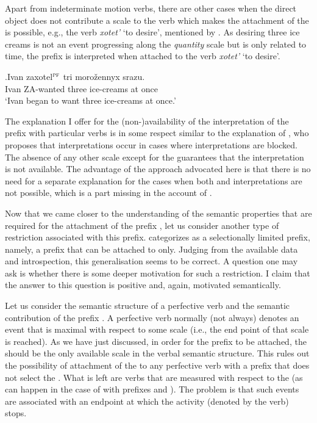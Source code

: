 Apart from indeterminate motion verbs, there are other cases when the direct object does not contribute a scale to the verb which makes the attachment of the   is possible, e.g., the verb \textit{xotet'} `to desire', mentioned by \citet{Braginsky:08}. As desiring three ice creams is not an event progressing along the \textit{quantity} scale but is only related to time, the prefix  is interpreted  when attached to the verb \textit{xotet'} `to desire'.

\exg.\label{ex:zaxotet}Ivan zaxotel$^{\textsc{pf}}$ tri moro\v{z}ennyx srazu.\\
Ivan ZA-wanted three ice-creams {at once}\\
\trans `Ivan began to want three ice-creams at once.'
\\

The explanation I offer for the (non-)availability of the  interpretation of the prefix  with particular verbs is in some respect similar to the explanation of \citet{Braginsky:08}, who proposes that  interpretations occur in cases where  interpretations are blocked. The absence of any other scale except for the  guarantees that the  interpretation is not available. The advantage of the approach advocated here is that there is no need for a separate explanation for the cases when both  and  interpretations are not possible, which is a part missing in the account of \citet{Braginsky:08}.

Now that we came closer to the understanding of the semantic properties that are required for the attachment of the  prefix , let us consider another type of restriction associated with this prefix. \citet{Tatevosov:09} categorizes  as a selectionally limited prefix, namely, a prefix that can be attached to  only. Judging from the available data and introspection, this generalisation seems to be correct. A question one may ask is whether there is some deeper motivation for such a restriction. I claim that the answer to this question is positive and, again, motivated semantically. 

Let us consider the semantic structure of a perfective verb and the semantic contribution of the  prefix . A perfective verb normally (not always) denotes an event that is maximal with respect to some scale (i.e., the end point of that scale is reached). As we have just discussed, in order for the  prefix  to be attached, the  should be the only available scale in the verbal semantic structure. This rules out the possibility of attachment of the   to any perfective verb with a prefix that does not select the . What is left are verbs that are measured with respect to the  (as can happen in the case of  with prefixes  and ). The problem is that such events are associated with an endpoint at which the activity (denoted by the  verb) stops. 


